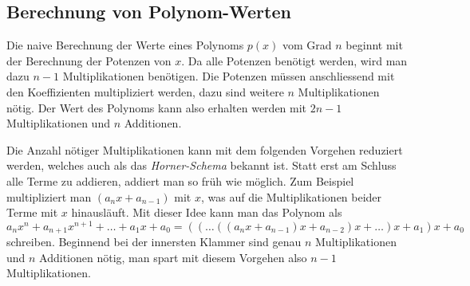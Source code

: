 \subsection{Berechnung von Polynom-Werten}
Die naive Berechnung der Werte eines Polynoms $p(x)$ vom Grad $n$
beginnt mit der Berechnung der Potenzen von $x$.
Da alle Potenzen benötigt werden, wird man dazu $n-1$ Multiplikationen
benötigen.
Die Potenzen müssen anschliessend mit den Koeffizienten multipliziert
werden, dazu sind weitere $n$ Multiplikationen nötig.
Der Wert des Polynoms kann also erhalten werden mit $2n-1$ Multiplikationen
und $n$ Additionen.

Die Anzahl nötiger Multiplikationen kann mit dem folgenden Vorgehen
reduziert werden, welches auch als das {\em Horner-Schema} bekannt ist.
%
Statt erst am Schluss alle Terme zu addieren, addiert man so früh
wie möglich.
Zum Beispiel multipliziert man $(a_nx+a_{n-1})$ mit $x$, was auf
die Multiplikationen beider Terme mit $x$ hinausläuft.
Mit dieser Idee kann man das Polynom als
\[
a_nx^n
+
a_{n+1}x^{n+1}
+
\dots
+
a_1x
+
a_0
=
((\dots((a_nx+a_{n-1})x+a_{n-2})x+\dots )x+a_1)x+a_0
\]
schreiben.
Beginnend bei der innersten Klammer sind genau $n$ Multiplikationen
und $n$ Additionen nötig, man spart mit diesem Vorgehen also
$n-1$ Multiplikationen. 



